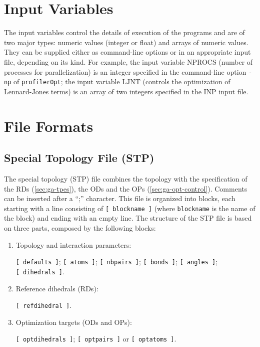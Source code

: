 \documentclass[10pt,a4paper,openany]{memoir}
\numberwithin{equation}{section}
\newcommand{\profileropt}[0]{\texttt{profilerOpt}}
\begin{document}
\section{Input Variables}
\label{sec:file-formats-input-variables}

The input variables control the details of execution of the programs
and are of two major types: numeric values (integer or float) and
arrays of numeric values. They can be supplied either as command-line
options or in an appropriate input file, depending on its kind.  For
example, the input variable NPROCS (number of processes for
parallelization) is an integer specified in the command-line option
\texttt{-np} of \profileropt{}; the input variable LJNT (controls the
optimization of Lennard-Jones terms) is an array of two integers
specified in the INP input file.

\section{File Formats}
\label{sec:file-formats-file-formats}

\subsection{Special Topology File (STP)}
\label{sec:file-formats-STP}

The special topology (STP) file combines the topology with the
specification of the RDs (\autoref{sec:ga-tpes}), the ODs and the OPs
(\autoref{sec:ga-opt-control}). Comments can be inserted after a ``;''
character.  This file is organized into blocks, each starting with a
line consisting of \texttt{[~blockname~]} (where \texttt{blockname} is
the name of the block) and ending with an empty line.  The structure
of the STP file is based on three parts, composed by the following
blocks:
\begin{enumerate}
\item Topology and interaction parameters:\par \texttt{[~defaults~]}; \texttt{[~atoms~]}; \texttt{[~nbpairs~]}; \texttt{[~bonds~]}; \texttt{[~angles~]}; \texttt{[~dihedrals~]}.
\item Reference dihedrals (RDs):\par\texttt{[~refdihedral~]}.
\item Optimization targets (ODs and OPs):\par\texttt{[~optdihedrals~]}; \texttt{[~optpairs~]} or \texttt{[~optatoms~]}.
\end{enumerate}
\end{document}

